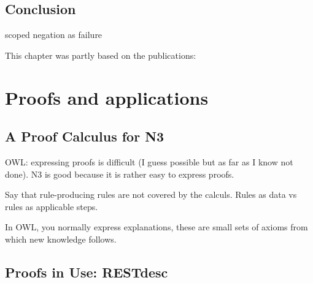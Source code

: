 \documentclass[11pt,a4paper,twoside]{book}
\begin{document}
\section{Conclusion}


scoped negation as failure

\newpage
This chapter was partly based on the publications:
\vspace{0.5cm}


\vspace{0.3cm}


\vspace{0.3cm}


\vspace{0.3cm}


\chapter{Proofs and applications}\label{proof}
\section{A Proof Calculus for N3}\label{cal}

OWL: expressing proofs is difficult (I guess possible but as far as I know not done). N3 is good because it is rather  easy to express proofs.

Say that rule-producing rules are not covered by the calculs. Rules as data vs rules as applicable steps.

In OWL, you normally express explanations, these are small sets of axioms from which new knowledge follows.




%
%
\section{Proofs in Use: RESTdesc}\label{restdesc}
\end{document}
